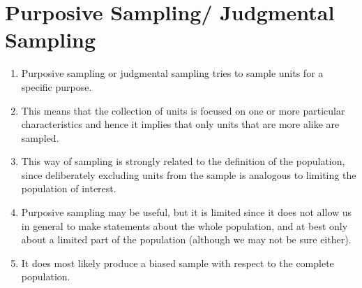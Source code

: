\section{Purposive Sampling/ Judgmental Sampling \cite{statistics/book/Statistics-for-Data-Scientists/Maurits-Kaptein}}\label{Sampling Plans/Non-representative Sampling/Purposive Sampling or Judgmental Sampling}

\begin{enumerate}
    \item Purposive sampling or judgmental sampling tries to sample units for a specific purpose. 
    \hfill \cite{statistics/book/Statistics-for-Data-Scientists/Maurits-Kaptein}
    
    \item This means that the collection of units is focused on one or more particular characteristics and hence it implies that only units that are more alike are sampled.
    \hfill \cite{statistics/book/Statistics-for-Data-Scientists/Maurits-Kaptein}

    \item This way of sampling is strongly related to the definition of the population, since deliberately excluding units from the sample is analogous to limiting the population of interest.
    \hfill \cite{statistics/book/Statistics-for-Data-Scientists/Maurits-Kaptein}

    \item Purposive sampling may be useful, but it is limited since it does not allow us in general to make statements about the whole population, and at best only about a limited part of the population (although we may not be sure either).
    \hfill \cite{statistics/book/Statistics-for-Data-Scientists/Maurits-Kaptein}

    \item It does most likely produce a biased sample with respect to the complete population.
    \hfill \cite{statistics/book/Statistics-for-Data-Scientists/Maurits-Kaptein}
\end{enumerate}
